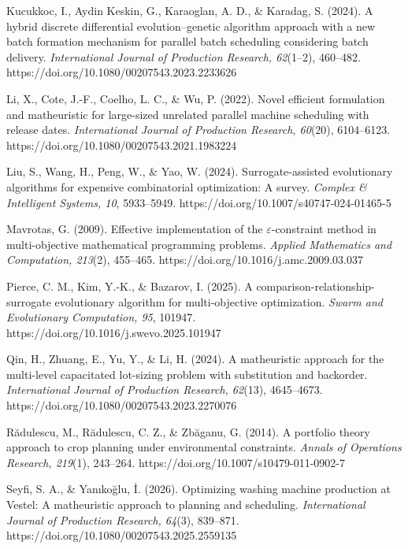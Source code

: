 \documentclass[]{interact}
\begin{document}
\begin{thebibliography}{}
Kucukkoc, I., Aydin Keskin, G., Karaoglan, A. D., \& Karadag, S. (2024). A hybrid discrete differential evolution--genetic algorithm approach with a new batch formation mechanism for parallel batch scheduling considering batch delivery. \emph{International Journal of Production Research, 62}(1--2), 460--482. https://doi.org/10.1080/00207543.2023.2233626

Li, X., Cote, J.-F., Coelho, L. C., \& Wu, P. (2022). Novel efficient formulation and matheuristic for large-sized unrelated parallel machine scheduling with release dates. \emph{International Journal of Production Research, 60}(20), 6104--6123. https://doi.org/10.1080/00207543.2021.1983224

Liu, S., Wang, H., Peng, W., \& Yao, W. (2024). Surrogate-assisted evolutionary algorithms for expensive combinatorial optimization: A survey. \emph{Complex \& Intelligent Systems, 10}, 5933--5949. https://doi.org/10.1007/s40747-024-01465-5

Mavrotas, G. (2009). Effective implementation of the $\varepsilon$-constraint method in multi-objective mathematical programming problems. \emph{Applied Mathematics and Computation, 213}(2), 455--465. https://doi.org/10.1016/j.amc.2009.03.037

Pierce, C. M., Kim, Y.-K., \& Bazarov, I. (2025). A comparison-relationship-surrogate evolutionary algorithm for multi-objective optimization. \emph{Swarm and Evolutionary Computation, 95}, 101947. https://doi.org/10.1016/j.swevo.2025.101947

Qin, H., Zhuang, E., Yu, Y., \& Li, H. (2024). A matheuristic approach for the multi-level capacitated lot-sizing problem with substitution and backorder. \emph{International Journal of Production Research, 62}(13), 4645--4673. https://doi.org/10.1080/00207543.2023.2270076

R\u{a}dulescu, M., R\u{a}dulescu, C. Z., \& Zb\u{a}ganu, G. (2014). A portfolio theory approach to crop planning under environmental constraints. \emph{Annals of Operations Research, 219}(1), 243--264. https://doi.org/10.1007/s10479-011-0902-7

Seyfi, S. A., \& Yan{\i}ko\u{g}lu, \.{I}. (2026). Optimizing washing machine production at Vestel: A matheuristic approach to planning and scheduling. \emph{International Journal of Production Research, 64}(3), 839--871. https://doi.org/10.1080/00207543.2025.2559135


\end{thebibliography}
\end{document}
